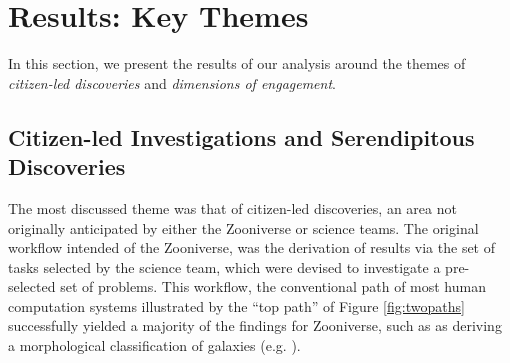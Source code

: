 \documentclass{sigchi}
\begin{document}

\section{Results: Key Themes}
In this section, we present the results of our analysis around the themes of \emph{citizen-led discoveries} and \emph{dimensions of engagement}.

\subsection{Citizen-led Investigations and Serendipitous Discoveries}

The most discussed theme was that of citizen-led discoveries, an area not originally anticipated by either the Zooniverse or science teams.  The original workflow intended of the Zooniverse, was the derivation of results via the set of tasks selected by the science team, which were devised to investigate a pre-selected set of problems.  This workflow, the conventional path of most human computation systems illustrated by the ``top path'' of Figure \ref{fig:twopaths} successfully yielded a majority of the findings for Zooniverse, such as as deriving a morphological classification of galaxies (e.g. \cite{fortson2011galaxy}).   
\end{document}
